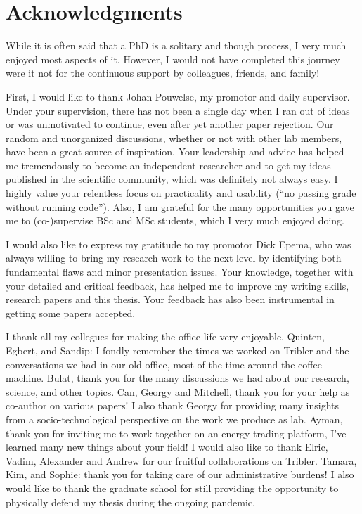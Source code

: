 \chapter*{Acknowledgments}

While it is often said that a PhD is a solitary and though process, I very much enjoyed most aspects of it.
However, I would not have completed this journey were it not for the continuous support by colleagues, friends, and family!

First, I would like to thank Johan Pouwelse, my promotor and daily supervisor.
Under your supervision, there has not been a single day when I ran out of ideas or was unmotivated to continue, even after yet another paper rejection.
Our random and unorganized discussions, whether or not with other lab members, have been a great source of inspiration.
Your leadership and advice has helped me tremendously to become an independent researcher and to get my ideas published in the scientific community, which was definitely not always easy.
I highly value your relentless focus on practicality and usability (\enquote{no passing grade without running code}).
Also, I am grateful for the many opportunities you gave me to (co-)supervise BSc and MSc students, which I very much enjoyed doing.

I would also like to express my gratitude to my promotor Dick Epema, who was always willing to bring my research work to the next level by identifying both fundamental flaws and minor presentation issues.
Your knowledge, together with your detailed and critical feedback, has helped me to improve my writing skills, research papers and this thesis.
Your feedback has also been instrumental in getting some papers accepted.

I thank all my collegues for making the office life very enjoyable.
Quinten, Egbert, and Sandip: I fondly remember the times we worked on Tribler and the conversations we had in our old office, most of the time around the coffee machine.
Bulat, thank you for the many discussions we had about our research, science, and other topics.
Can, Georgy and Mitchell, thank you for your help as co-author on various papers!
I also thank Georgy for providing many insights from a socio-technological perspective on the work we produce as lab.
Ayman, thank you for inviting me to work together on an energy trading platform, I've learned many new things about your field!
I would also like to thank Elric, Vadim, Alexander and Andrew for our fruitful collaborations on Tribler.
Tamara, Kim, and Sophie: thank you for taking care of our administrative burdens!
I also would like to thank the graduate school for still providing the opportunity to physically defend my thesis during the ongoing pandemic.

